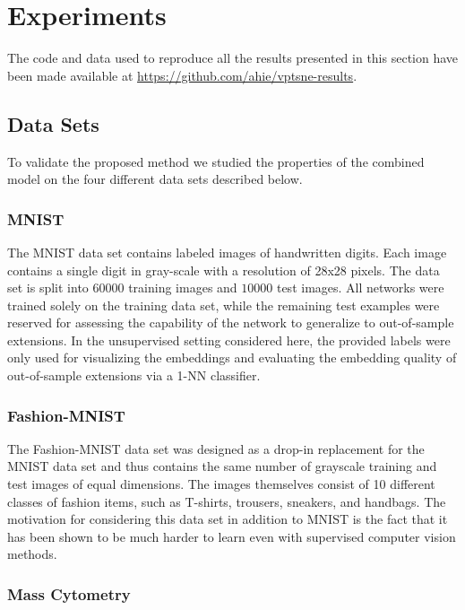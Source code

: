 \chapter{Experiments}
\label{ch:experiments}

The code and data used to reproduce all the results presented in this section have been made available at \url{https://github.com/ahie/vptsne-results}.

\section{Data Sets}

To validate the proposed method we studied the properties of the combined model on the four different data sets described below.

\subsection{MNIST}

The MNIST data set \citep{mnist} contains labeled images of handwritten digits. Each image contains a single digit in gray-scale with a resolution of 28x28 pixels. The data set is split into $60000$ training images and $10000$ test images. All networks were trained solely on the training data set, while the remaining test examples were reserved for assessing the capability of the network to generalize to out-of-sample extensions. In the unsupervised setting considered here, the provided labels were only used for visualizing the embeddings and evaluating the embedding quality of out-of-sample extensions via a 1-NN classifier.

\subsection{Fashion-MNIST}

The Fashion-MNIST data set \cite{fashion_mnist} was designed as a drop-in replacement for the MNIST data set and thus contains the same number of grayscale training and test images of equal dimensions. The images themselves consist of 10 different classes of fashion items, such as T-shirts, trousers, sneakers, and handbags. The motivation for considering this data set in addition to MNIST is the fact that it has been shown to be much harder to learn even with supervised computer vision methods.

\subsection{Mass Cytometry}

